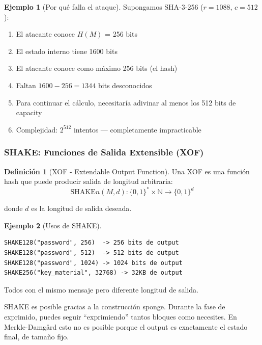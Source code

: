 \documentclass[11pt,a4paper,twoside,openright]{book}
\theoremstyle{definition}
\newtheorem{definition}{Definición}[chapter]
\newtheorem{example}{Ejemplo}[chapter]
\theoremstyle{plain}
\theoremstyle{remark}
\begin{document}
\begin{example}[Por qué falla el ataque]
Supongamos SHA-3-256 ($r = 1088$, $c = 512$):

\begin{enumerate}
    \item El atacante conoce $H(M)$ = 256 bits
    \item El estado interno tiene 1600 bits
    \item El atacante conoce como máximo 256 bits (el hash)
    \item Faltan $1600 - 256 = 1344$ bits desconocidos
    \item Para continuar el cálculo, necesitaría adivinar al menos los 512 bits de capacity
    \item Complejidad: $2^{512}$ intentos --- completamente impracticable
\end{enumerate}
\end{example}

\subsubsection{SHAKE: Funciones de Salida Extensible (XOF)}

\begin{definition}[XOF - Extendable Output Function]
Una XOF es una función hash que puede producir salida de longitud arbitraria:
\[ \text{SHAKE}n(M, d) : \{0,1\}^* \times \mathbb{N} \to \{0,1\}^d \]

donde $d$ es la longitud de salida deseada.
\end{definition}

\begin{example}[Usos de SHAKE]
\begin{verbatim}
SHAKE128("password", 256)  -> 256 bits de output
SHAKE128("password", 512)  -> 512 bits de output
SHAKE128("password", 1024) -> 1024 bits de output
SHAKE256("key_material", 32768) -> 32KB de output
\end{verbatim}

Todos con el mismo mensaje pero diferente longitud de salida.
\end{example}

\begin{keyidea}
SHAKE es posible gracias a la construcción sponge. Durante la fase de exprimido, puedes seguir ``exprimiendo'' tantos bloques como necesites. En Merkle-Damgård esto no es posible porque el output es exactamente el estado final, de tamaño fijo.
\end{keyidea}
\end{document}
